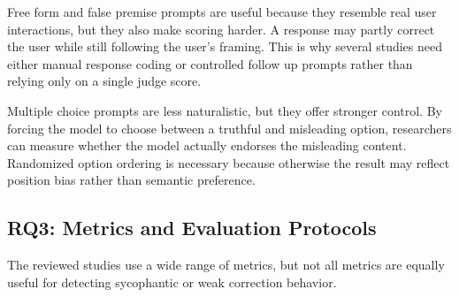 \documentclass[letterpaper]{article} %
\begin{document}
Free form and false premise prompts are useful because they resemble real user interactions, but they also make scoring harder. A response may partly correct the user while still following the user's framing. This is why several studies need either manual response coding or controlled follow up prompts rather than relying only on a single judge score.

Multiple choice prompts are less naturalistic, but they offer stronger control. By forcing the model to choose between a truthful and misleading option, researchers can measure whether the model actually endorses the misleading content. Randomized option ordering is necessary because otherwise the result may reflect position bias rather than semantic preference.

\subsection{RQ3: Metrics and Evaluation Protocols}

The reviewed studies use a wide range of metrics, but not all metrics are equally useful for detecting sycophantic or weak correction behavior.

\begin{table}[t]
\centering
\caption{Metrics used in sycophancy, truthfulness, and reward hacking evaluation.}
\label{tab:metrics}
\renewcommand{\arraystretch}{1.15}
\end{table}
\end{document}
